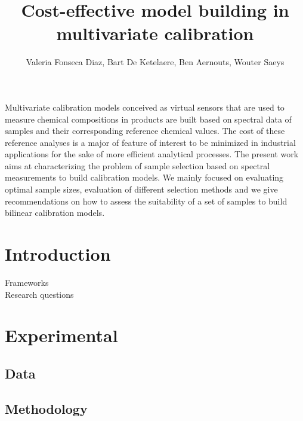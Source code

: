 \documentclass{article}
\renewenvironment{abstract}
  {{\bfseries\noindent{\abstractname}\par\nobreak}\footnotesize}
  {\bigskip}
\begin{document}
\title{Cost-effective model building in multivariate calibration}


\author[ ]{Valeria Fonseca Diaz, Bart De Ketelaere, Ben Aernouts, Wouter Saeys}

\affil[ ]{}
\vspace{-1em}


\date{}

\begingroup
\let\center\flushleft
\let\endcenter\endflushleft
\maketitle
\endgroup

\begin{abstract}
{
Multivariate calibration models conceived as virtual sensors that are used to measure chemical compositions in products are built based on spectral data of samples and their corresponding reference chemical values. The cost of these reference analyses is a major of feature of interest to be minimized in industrial applications for the sake of more efficient analytical processes. The present work aims at characterizing the problem of sample selection based on spectral measurements to build calibration models. We mainly focused on evaluating optimal sample sizes, evaluation of different selection methods and we give recommendations on how to assess the suitability of a set of samples to build bilinear calibration models.
}\\%
\end{abstract}%



\section*{Introduction}\label{introduction}

Frameworks \\
Research questions

\section*{Experimental}\label{experimental}


\subsection*{Data}\label{data}

\subsection*{Methodology}\label{methodology}
\end{document}
